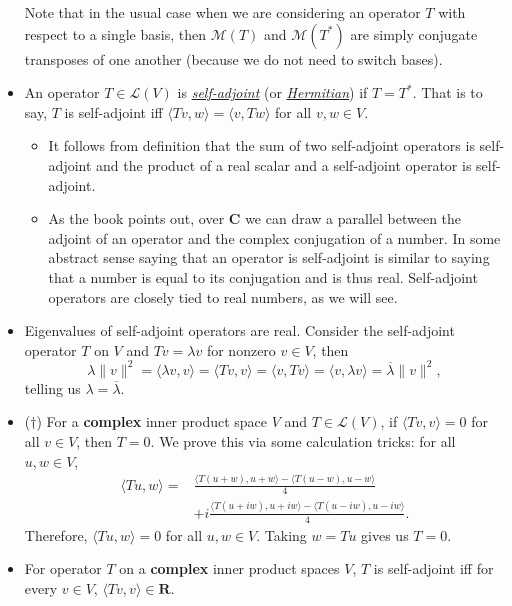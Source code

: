 \documentclass[11pt]{article}
\newcommand{\df}[1]{\ul{\textit{\textsf{#1}}}}
\newcommand{\R}{\mathbf{R}}
\newcommand{\C}{\mathbf{C}}
\newcommand{\conj}[1]{\overline{#1}}
\newcommand{\inp}[2]{\langle #1, #2 \rangle}
\newcommand{\nm}[1]{\|#1\|}
\newcommand{\LV}{\mathcal{L}(V)}
\newcommand{\M}{\mathcal{M}}
\begin{document}
\begin{itemize}
    Note that in the usual case when we are considering an operator $T$ with respect to a single basis, then $\M(T)$ and $\M(T^*)$ are simply conjugate transposes of one another (because we do not need to switch bases).
    \item An operator $T \in \LV$ is \df{self-adjoint} (or \df{Hermitian}) if $T=T^*$. That is to say, $T$ is self-adjoint iff $\inp{Tv}{w}=\inp{v}{Tw}$ for all $v,w \in V$.
    \begin{itemize}
        \item It follows from definition that the sum of two self-adjoint operators is self-adjoint and the product of a real scalar and a self-adjoint operator is self-adjoint.
        \item As the book points out, over $\C$ we can draw a parallel between the adjoint of an operator and the complex conjugation of a number. In some abstract sense saying that an operator is self-adjoint is similar to saying that a number is equal to its conjugation and is thus real. Self-adjoint operators are closely tied to real numbers, as we will see.
    \end{itemize}
    \item Eigenvalues of self-adjoint operators are real. Consider the self-adjoint operator $T$ on $V$ and $Tv = \lambda v$ for nonzero $v \in V$, then $$\lambda \nm{v}^2 = \inp{\lambda v}{v} = \inp{Tv}{v} = \inp{v}{Tv} = \inp{v}{\lambda v} = \conj{\lambda}\nm{v}^2,$$ telling us $\lambda = \conj{\lambda}$.
    \item ($\dagger$) For a \textbf{complex} inner product space $V$ and $T \in \LV$, if $\inp{Tv}{v}=0$ for all $v \in V$, then $T = 0$. We prove this via some calculation tricks: for all $u,w \in V$,
    \begin{align*}
        \inp{Tu}{w} = & \frac{\inp{T(u+w)}{u+w} - \inp{T(u-w)}{u-w}}{4} \\ & + i \frac{\inp{T(u+iw)}{u+iw} - \inp{T(u-iw)}{u-iw}}{4}.
    \end{align*}
    Therefore, $\inp{Tu}{w} = 0$ for all $u,w \in V$. Taking $w = Tu$ gives us $T = 0$.
    \item For operator $T$ on a \textbf{complex} inner product spaces $V$, $T$ is self-adjoint iff for every $v \in V$, $\inp{Tv}{v} \in \R$.
    

\end{itemize}
\end{document}
